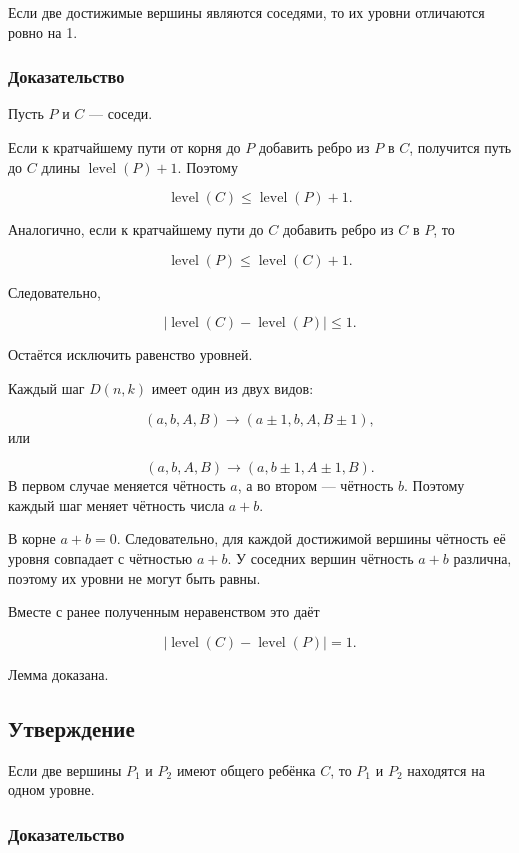 Если две достижимые вершины являются соседями, то их уровни отличаются
ровно на 1.

\subsubsection{Доказательство}

Пусть $P$ и $C$ --- соседи.

Если к кратчайшему пути от корня до $P$ добавить ребро из $P$ в $C$,
получится путь до $C$ длины $\operatorname{level}(P) + 1$. Поэтому

$$
\operatorname{level}(C) \le \operatorname{level}(P) + 1.
$$

Аналогично, если к кратчайшему пути до $C$ добавить ребро из $C$ в $P$,
то

$$
\operatorname{level}(P) \le \operatorname{level}(C) + 1.
$$

Следовательно,

$$
|\operatorname{level}(C) - \operatorname{level}(P)| \le 1.
$$

Остаётся исключить равенство уровней.

Каждый шаг $D(n,k)$ имеет один из двух видов:

$$(a,b,A,B)\to(a\pm1,b,A,B\pm1),
$$
или

$$(a,b,A,B)\to(a,b\pm1,A\pm1,B).
$$
В первом случае меняется чётность $a$, а во втором --- чётность $b$.
Поэтому каждый шаг меняет чётность числа $a + b$.

В корне $a + b = 0$. Следовательно, для каждой достижимой вершины
чётность её уровня совпадает с чётностью $a + b$. У соседних вершин
чётность $a + b$ различна, поэтому их уровни не могут быть равны.

Вместе с ранее полученным неравенством это даёт

$$
|\operatorname{level}(C) - \operatorname{level}(P)| = 1.
$$

Лемма доказана.

\subsection{Утверждение}

Если две вершины $P_1$ и $P_2$ имеют общего ребёнка $C$, то $P_1$ и $P_2$
находятся на одном уровне.

\subsubsection{Доказательство}

